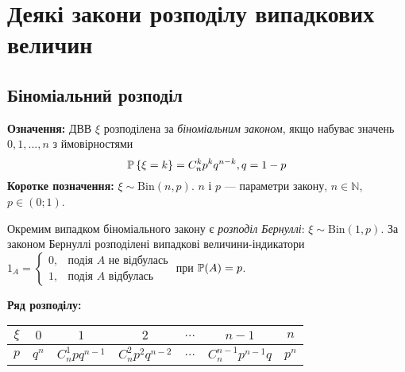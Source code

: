 \section{Деякі закони розподілу випадкових величин}

\subsection{Біноміальний розподіл}
\noindent\textbf{Означення:}
    ДВВ $\xi$ розподілена за \emph{біноміальним законом}, 
    якщо набуває значень $0,1,...,n$ з ймовірностями \begin{equation}
        \P\left\{\xi = k\right\} = C_n^k p^k q^{n-k}, q = 1 - p
    \end{equation}
\textbf{Коротке позначення:} $\xi \sim \mathrm{Bin}(n, p)$.
    $n$ і $p$ --- параметри закону, $n\in \mathbb{N}$, $p\in (0;1)$.

Окремим випадком біноміального закону є \emph{розподіл Бернуллі}: $\xi \sim \mathrm{Bin}(1, p)$.
За законом Бернуллі розподілені випадкові величини-індикатори $1_A = \begin{cases}
    0, & \text{подія }A\text{ не відбулась}\\ 1, & \text{подія }A\text{ відбулась}
\end{cases}$ при $\P(A) = p$.

\noindent\textbf{Ряд розподілу:}
\begin{center}
    \begin{tabular}{|c|c|c|c|c|c|c|}
        \hline
        $\xi$ & $0$ & $1$ & $2$ & $...$ & $n-1$ & $n$ \\
        \hline
        $p$ & $q^n$ & $C_n^1 pq^{n-1}$ & $C_n^2 p^2 q^{n-2}$ & $...$ & $C_n^{n-1}p^{n-1}q$ & $p^n$ \\
        \hline
    \end{tabular}
\end{center}

